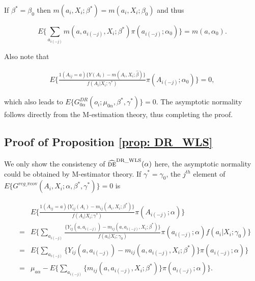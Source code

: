 \documentclass[oupdraft]{bio}
\begin{document}
If $\beta^{*}=\beta_0$ then $m(a_i,X_i;\beta^{*})=m(a_i,X_i;\beta_0)$  and thus

\vspace{-.4cm}
\begin{equation*}
 E\Biggl\{\sum_{a_{i(-j)}}m(a,a_{i(-j)},X_i;\beta^{*})\pi(a_{i(-j)};\alpha_0)\Biggr\}=m(a,\alpha_0).
\end{equation*}

\vspace{-.4cm}
\noindent Also note that

\vspace{-1cm}
\begin{eqnarray*}
  E\Biggl\{\frac{1(A_{ij}=a)\{Y(A_i)-m(A_i,X_i;\hat\beta)\}}{{f}(A_i|X_i;\gamma^{*})}\pi(A_{i(-j)};\alpha_0)\Biggr\}
=0,
\end{eqnarray*}


\noindent which also leads to $E\{G^{DR}_{0\alpha}(o_i;\mu_{0\alpha},\beta^{*},\gamma^{*})\}=0$. The asymptotic normality follows directly from the M-estimation theory, thus completing the proof.

\subsection*{Proof of Proposition \ref{prop: DR_WLS}}

We only show the consistency of $\widehat{\textsc{de}}^{\text{DR\_WLS}}(\alpha)$ here, the asymptotic normality could be obtained by M-estimator theory. If $\gamma^{*}=\gamma_0$, the $j^{th}$ element of $E\{G^{reg\_\pi\text{cov}}(A_i,X_i;\alpha,\beta^{*},\gamma^{*})\}=0$ is

\begin{eqnarray*}
  &&E\Biggl\{\frac{1(A_{ij}=a)\{Y_{ij}(A_i)-m_{ij}(A_i,X_i;\beta^{\ast})\}}{{f}(A_i|X_i;\gamma^{*})}
  \pi(A_{i(-j)};\alpha)\biggr\}\\
    &=&E\Biggl\{\sum_{a_{i(-j)}}\frac{\{Y_{ij}(a,a_{i(-j)})-m_{ij}(a,a_{i(-j)},X_i;\beta^{\ast})\}}{{f}(a_i|X_i;\gamma_0)}
  \pi(a_{i(-j)};\alpha){f}(a_i|X_i;\gamma_0)\biggr\}\\
      &=&E\Biggl\{\sum_{a_{i(-j)}}\{Y_{ij}(a,a_{i(-j)})-m_{ij}(a,a_{i(-j)},X_i;\beta^{\ast})\}
  \pi(a_{i(-j)};\alpha)\biggr\}\\
  &=&\mu_{a\alpha}-E\Biggl\{\sum_{a_{i(-j)}}\{m_{ij}(a,a_{i(-j)},X_i;\beta^{\ast})\}
  \pi(a_{i(-j)};\alpha)\biggr\}.
\end{eqnarray*}
\end{document}
